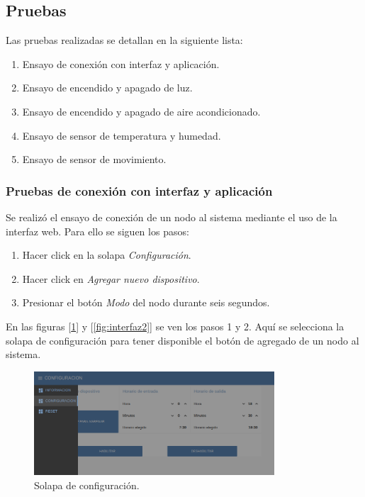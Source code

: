 \subsection{Pruebas}

Las pruebas realizadas se detallan en la siguiente lista:

\begin{enumerate}
\item Ensayo de conexión con interfaz y aplicación.
\item Ensayo de encendido y apagado de luz.
\item Ensayo de encendido y apagado de aire acondicionado.
\item Ensayo de sensor de temperatura y humedad.
\item Ensayo de sensor de movimiento.
\end{enumerate}

\subsubsection{Pruebas de conexión con interfaz y aplicación}

Se realizó el ensayo de conexión de un nodo al sistema mediante el uso de la interfaz web. Para ello se siguen los pasos:

\begin{enumerate}
\item Hacer click en la solapa {\textit{Configuración}}.
\item Hacer click en {\textit{Agregar nuevo dispositivo}}.
\item Presionar el botón {\textit{Modo}} del nodo durante seis segundos.
\end{enumerate}

En las figuras [\ref{fig:interfaz1}] y [\ref{fig:interfaz2}] se ven los pasos 1 y 2. Aquí se selecciona la solapa de configuración para tener disponible el botón de agregado de un nodo al sistema.

\begin{figure}[ht!]
	\centering
	\includegraphics[width=0.8\textwidth]{./Figures/interfaz1.png}
	\caption{Solapa de configuración.}
	\label{fig:interfaz1}
\end{figure}

